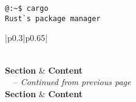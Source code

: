 \newpage
\begin{lstlisting}[style=zsh]
@:~$ cargo   
Rust`s package manager
\end{lstlisting}
\begin{longtable}{|p{0.3\linewidth}|p{0.65\linewidth}|}
	\caption{Cargo Command-Line Interface} \\
	\hline
	\textbf{Section} & \textbf{Content} \\
	\hline
	\endfirsthead
	{\tablename\ \thetable\ -- \textit{Continued from previous page}} \\
	\hline
	\textbf{Section} & \textbf{Content} \\
	\hline
	\endhead
	\hline {} \\
	\endfoot
	\hline
	\endlastfoot
	

\end{longtable}
